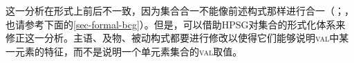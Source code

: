 \noindent
这一分析在形式上前后不一致，因为集合合一不能像前述构式那样进行合一（\citealp{Mueller2006d}；\citealp[\S~7.5.2]{MuellerLehrbuch1}，也请参考下面的\ref{sec-formal-bcg}）。但是，可以借助HPSG对集合的形式化体系来修正这一分析\citep{ps,PM90a}。主语、及物、被动构式都要进行修改以使得它们能够说明\textsc{val}中某一元素的特征，而不是说明一个单元素集合的\textsc{val}取值。

